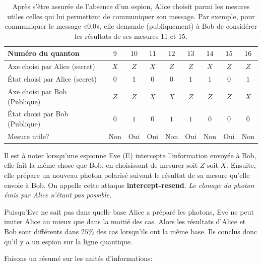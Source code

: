 \begin{table}[htbp]
\centering
\begin{tabular}
[c]{|l|c|c|c|c|c|c|c|c|}\hline
\rowcolor[gray]{0.8}Numéro du quanton & $9$ & $10$ & $11$ & $12$ & $13$ & $14$ &
$15$ & $16$\\\hline
Axe choisi par Alice (secret) & $X$ & $Z$ & $X$ & $Z$ & $Z$ & $X$ & $Z$ &
$Z$\\\hline
État choisi par Alice (secret) & $0$ & $1$ & $0$ & $0$ & $1$ & $1$ & $0$ &
$1$\\\hline
Axe choisi par Bob (Publique) & $Z$ & $Z$ & $X$ & $X$ & $Z$ & $Z$ & $Z$ &
$X$\\\hline
État choisi par Bob (Publique) & $0$ & $1$ & $0$ & $1$ & $1$ & $0$ & $0$ &
$0$\\\hline
Mesure utile? & \multicolumn{1}{|l|}{Non} & \multicolumn{1}{|l|}{Oui} &
\multicolumn{1}{|l|}{Oui} & \multicolumn{1}{|l|}{Non} &
\multicolumn{1}{|l|}{Oui} & \multicolumn{1}{|l|}{Non} &
\multicolumn{1}{|l|}{Oui} & \multicolumn{1}{|l|}{Non}\\\hline
\end{tabular}
\caption{Après s'être assurée de l'absence d'un espion, Alice choisit parmi les
mesures utiles celles qui lui permettent de communiquer son message. Par
exemple, pour communiquer le message «0,0», elle demande (publiquement) à Bob de
considérer les résultats de ses mesures 11 et 15.}
\label{tab:BB84SsEspion2}%
\end{table}%

Il est à noter lorsqu'une espionne Eve (E) intercepte l'information envoyée à
Bob, elle fait la même chose que Bob, en choisissant de mesurer soit $Z$ soit
$X$. Ensuite, elle prépare un nouveau photon polarisé suivant le résultat de sa
mesure qu'elle envoie à Bob. On appelle cette attaque \textbf{intercept-resend}.
\emph{Le clonage du photon émis par Alice n'étant pas possible.}

Puisqu'Eve ne sait pas dans quelle base Alice a préparé les photons, Eve ne peut
imiter Alice au mieux que dans la moitié des cas. Alors les résultats d'Alice et
Bob sont différents dans $25\%$ des cas lorsqu'ils ont la même base. Ils conclus
donc qu'il y a un espion sur la ligne quantique.

Faisons un résumé sur les unités d'informations:

